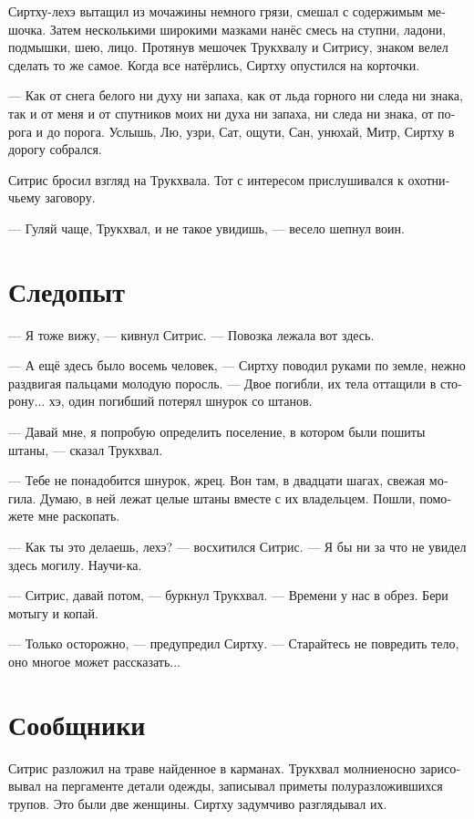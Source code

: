 \documentclass[a4paper,12pt,fleqn]{book}\usepackage{polyglossia}\setdefaultlanguage[babelshorthands=true]{russian}\setotherlanguage{english}\defaultfontfeatures{Ligatures=TeX,Mapping=tex-text}\usepackage{xcolor}\newcommand{\ml}[3]{#2}
\begin{document}
Сиртху-лехэ вытащил из мочажины немного грязи, смешал с содержимым мешочка.
Затем несколькими широкими мазками нанёс смесь на ступни, ладони, подмышки, шею, лицо.
Протянув мешочек Трукхвалу и Ситрису, знаком велел сделать то же самое.
Когда все натёрлись, Сиртху опустился на корточки.

--- Как от снега белого ни духу ни запаха, как от льда горного ни следа ни знака, так и от меня и от спутников моих ни духа ни запаха, ни следа ни знака, от порога и до порога.
Услышь, Лю, узри, Сат, ощути, Сан, унюхай, Митр, Сиртху в дорогу собрался.

Ситрис бросил взгляд на Трукхвала.
Тот с интересом прислушивался к охотничьему заговору.

--- Гуляй чаще, Трукхвал, и не такое увидишь, --- весело шепнул воин.

\section{Следопыт}

--- Я тоже вижу, --- кивнул Ситрис.
--- Повозка лежала вот здесь.

--- А ещё здесь было восемь человек, --- Сиртху поводил руками по земле, нежно раздвигая пальцами молодую поросль.
--- Двое погибли, их тела оттащили в сторону... хэ, один погибший потерял шнурок со штанов.

--- Давай мне, я попробую определить поселение, в котором были пошиты штаны, --- сказал Трукхвал.

--- Тебе не понадобится шнурок, жрец.
Вон там, в двадцати шагах, свежая могила.
Думаю, в ней лежат целые штаны вместе с их владельцем.
Пошли, поможете мне раскопать.

--- Как ты это делаешь, лехэ? --- восхитился Ситрис.
--- Я бы ни за что не увидел здесь могилу.
Научи-ка.

--- Ситрис, давай потом, --- буркнул Трукхвал.
--- Времени у нас в обрез.
Бери мотыгу и копай.

--- Только осторожно, --- предупредил Сиртху.
--- Старайтесь не повредить тело, оно многое может рассказать...

\section{Сообщники}

Ситрис разложил на траве найденное в карманах.
Трукхвал молниеносно зарисовывал на пергаменте детали одежды, записывал приметы полуразложившихся трупов.
Это были две женщины.
Сиртху задумчиво разглядывал их.
\end{document}
